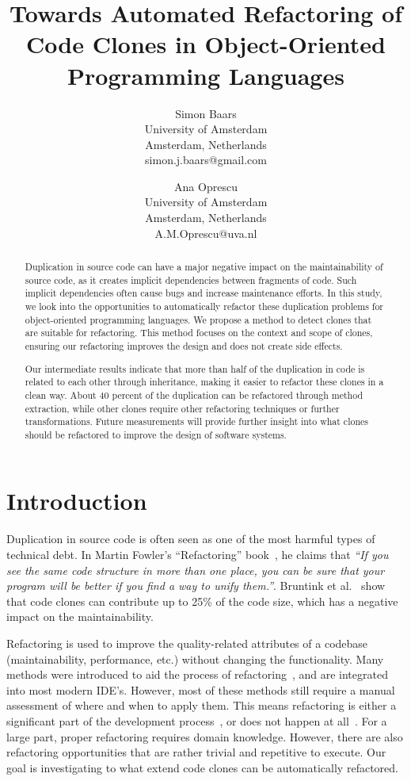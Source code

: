 \documentclass[a4paper]{article}
\title{Towards Automated Refactoring of Code Clones in Object-Oriented Programming Languages}
\author{
Simon Baars \\ University of Amsterdam\\
                Amsterdam, Netherlands \\ simon.j.baars@gmail.com
\and
Ana Oprescu \\ University of Amsterdam\\
                Amsterdam, Netherlands \\
                A.M.Oprescu@uva.nl
}
\begin{document}
\maketitle

\begin{abstract}
Duplication in source code can have a major negative impact on the maintainability of source code, as it creates implicit dependencies between fragments of code. Such implicit dependencies often cause bugs and increase maintenance efforts. In this study, we look into the opportunities to automatically refactor these duplication problems for object-oriented programming languages. We propose a method to detect clones that are suitable for refactoring. This method focuses on the context and scope of clones, ensuring our refactoring improves the design and does not create side effects.

Our intermediate results indicate that more than half of the duplication in code is related to each other through inheritance, making it easier to refactor these clones in a clean way. About 40 percent of the duplication can be refactored through method extraction, while other clones require other refactoring techniques or further transformations. Future measurements will provide further insight into what clones should be refactored to improve the design of software systems.
\end{abstract}

\section{Introduction}
Duplication in source code is often seen as one of the most harmful types of technical debt. In Martin Fowler's ``Refactoring'' book~\cite{fowler1999refactoring}, he claims that \textit{``If you see the same code structure in more than one place, you can be sure that your program will be better if you find a way to unify them.''}. Bruntink et al.~\cite{bruntink2005use} show that code clones can contribute up to 25\% of the code size, which has a negative impact on the maintainability.

Refactoring is used to improve the quality-related attributes of a codebase (maintainability, performance, etc.) without changing the functionality. Many methods were introduced to aid the process of refactoring~\cite{fowler1999refactoring, wake2004refactoring}, and are integrated into most modern IDE's. However, most of these methods still require a manual assessment of where and when to apply them. This means refactoring is either a significant part of the development process~\cite{lientz1978characteristics, mens2004survey}, or does not happen at all~\cite{mens2003refactoring}. For a large part, proper refactoring requires domain knowledge. However, there are also refactoring opportunities that are rather trivial and repetitive to execute. Our goal is investigating to what extend code clones can be automatically refactored.
\end{document}
